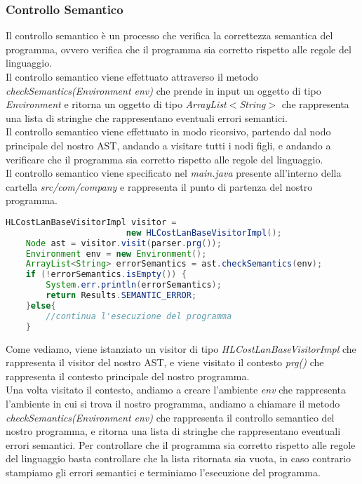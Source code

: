 \documentclass[../../main.tex]{subfiles}
\begin{document}
\subsubsection{Controllo Semantico}
Il controllo semantico è un processo che verifica la correttezza semantica del programma, ovvero verifica che il programma sia corretto rispetto alle regole del linguaggio.\\
Il controllo semantico viene effettuato attraverso il metodo \textit{checkSemantics(Environment env)} che prende in input un oggetto di tipo \textit{Environment} e ritorna un oggetto di tipo \textit{ArrayList$<$String$>$} che rappresenta una lista di stringhe che rappresentano eventuali errori semantici.\\
Il controllo semantico viene effettuato in modo ricorsivo, partendo dal nodo principale del nostro AST, andando a visitare tutti i nodi figli, e andando a verificare che il programma sia corretto rispetto alle regole del linguaggio.\\
Il controllo semantico viene specificato nel \textit{main.java} presente all'interno della cartella \textit{src/com/company} e rappresenta il punto di partenza del nostro programma.
\newpage
\begin{lstlisting}[language=Java, caption={Inizio Controllo semantico }]
    HLCostLanBaseVisitorImpl visitor = 
                        new HLCostLanBaseVisitorImpl();
    Node ast = visitor.visit(parser.prg());
    Environment env = new Environment();
    ArrayList<String> errorSemantics = ast.checkSemantics(env);
    if (!errorSemantics.isEmpty()) {
        System.err.println(errorSemantics);
        return Results.SEMANTIC_ERROR;
    }else{
        //continua l'esecuzione del programma
    }
\end{lstlisting}
Come vediamo, viene istanziato un visitor di tipo \textit{HLCostLanBaseVisitorImpl} che rappresenta il visitor del nostro AST, e viene visitato il contesto \textit{prg()} che rappresenta il contesto principale del nostro programma.\\
Una volta visitato il contesto, andiamo a creare l'ambiente \textit{env} che rappresenta l'ambiente in cui si trova il nostro programma, andiamo a chiamare il metodo \textit{checkSemantics(Environment env)} che rappresenta il controllo semantico del nostro programma, e ritorna una lista di stringhe che rappresentano eventuali errori semantici. Per controllare che il programma sia corretto rispetto alle regole del linguaggio basta controllare che la lista ritornata sia vuota, in caso contrario stampiamo gli errori semantici e terminiamo l'esecuzione del programma.\\
\end{document}
